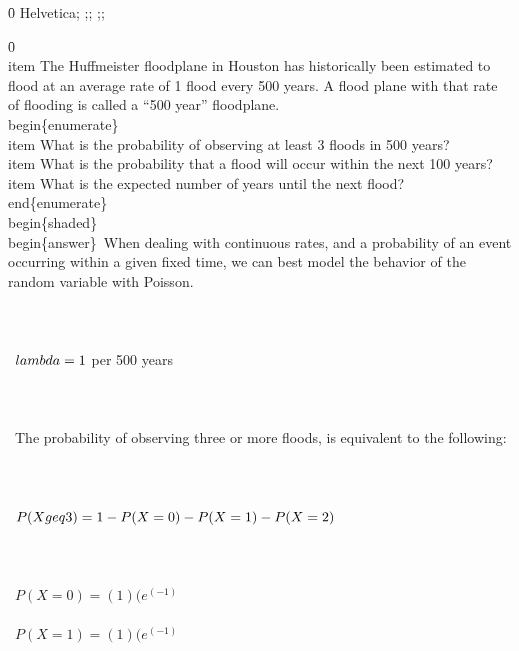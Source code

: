 {\ansi{}
{\fonttbl\f0\fswiss{} Helvetica;}
{;;}
{\*\expandedcolortbl;;}
\pard{}\pardirnatural{}

\f0      %
    \\item The Huffmeister floodplane in Houston has historically been estimated to flood at an average rate of 1 flood every 500 years. A flood plane with that rate of flooding is called a ``500 year'' floodplane.\
    \\begin\{enumerate\}\
        \\item What is the probability of observing at least 3 floods in 500 years?\
        \\item What is the probability that a flood will occur within the next 100 years?\
        \\item What is the expected number of years until the next flood?\
    \\end\{enumerate\}\
    \
    \\begin\{shaded\}\
    \\begin\{answer\}\
    When dealing with continuous rates, and a probability of an event occurring within a given fixed time, we can best model the behavior of the random variable with Poisson. \\\\ \\\\ \
    $\\lambda = 1$ per 500 years\\\\ \\\\ \
    The probability of observing three or more floods, is equivalent to the following: \\\\ \\\\ \
    $P(X\\geq 3) = 1 - P(X=0) - P(X=1) - P(X=2)$ \\\\ \\\\ \
    $P(X=0) = (1)(e^(-1)$ \\\\\
    $P(X=1) = (1)(e^(-1)$ \\\\\
}
